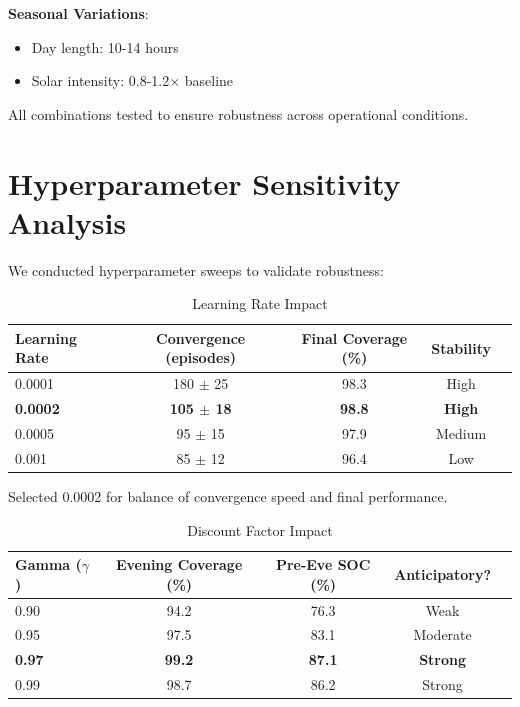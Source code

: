 \documentclass[11pt,a4paper]{article}
\begin{document}
\textbf{Seasonal Variations}:
\begin{itemize}
    \item Day length: 10-14 hours
    \item Solar intensity: 0.8-1.2$\times$ baseline
\end{itemize}

All combinations tested to ensure robustness across operational conditions.

\section{Hyperparameter Sensitivity Analysis}
\label{app:sensitivity}

We conducted hyperparameter sweeps to validate robustness:

\begin{table}[h]
\centering
\caption{Learning Rate Impact}
\begin{tabular}{lcccc}
\toprule
\textbf{Learning Rate} & \textbf{Convergence (episodes)} & \textbf{Final Coverage (\%)} & \textbf{Stability} \\
\midrule
0.0001 & 180 $\pm$ 25 & 98.3 & High \\
\textbf{0.0002} & \textbf{105 $\pm$ 18} & \textbf{98.8} & \textbf{High} \\
0.0005 & 95 $\pm$ 15 & 97.9 & Medium \\
0.001 & 85 $\pm$ 12 & 96.4 & Low \\
\bottomrule
\end{tabular}
\end{table}

Selected 0.0002 for balance of convergence speed and final performance.

\begin{table}[h]
\centering
\caption{Discount Factor Impact}
\begin{tabular}{lcccc}
\toprule
\textbf{Gamma ($\gamma$)} & \textbf{Evening Coverage (\%)} & \textbf{Pre-Eve SOC (\%)} & \textbf{Anticipatory?} \\
\midrule
0.90 & 94.2 & 76.3 & Weak \\
0.95 & 97.5 & 83.1 & Moderate \\
\textbf{0.97} & \textbf{99.2} & \textbf{87.1} & \textbf{Strong} \\
0.99 & 98.7 & 86.2 & Strong \\
\bottomrule
\end{tabular}
\end{table}
\end{document}

